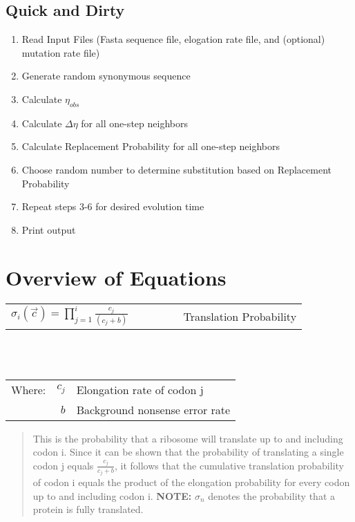 \documentclass{article}
\begin{document}
	\subsection{Quick and Dirty}
		\begin{enumerate}
			\item Read Input Files (Fasta sequence file, elogation rate file, and (optional) mutation rate file)
			\item Generate random synonymous sequence
			\item Calculate $\eta_{obs}$
			\item Calculate $\Delta\eta$ for all one-step neighbors
			\item Calculate Replacement Probability for all one-step neighbors
			\item Choose random number to determine substitution based on Replacement Probability
			\item Repeat steps 3-6 for desired evolution time
			\item Print output
		\end {enumerate}

	
		
\section{Overview of Equations}
	\begin{center}	
	
	\begin{tabular}[c]{r |l|}
		\cline{2-2}
		{\Large $\sigma_{i}(\vec{c})  =  \prod_{j=1}^i \frac{c_{j}}{(c_{j} + b)} \qquad \qquad$} & Translation Probability \\ \cline{2-2}
	\end{tabular} \\\
	
	\begin{tabular}{c r @{=} l}
		Where: & $c_{j}$ & Elongation rate of codon j \\
		& $b$ & Background nonsense error rate \\
	\end{tabular}
		
	\end{center}
	
	\begin{quote}
		This is the probability that a ribosome will translate up to and including codon i. Since it can be shown that the probability of 
		translating a single codon j equals $\frac{c_{j}}{c_{j}+b}$, it follows that the cumulative translation probability of codon i equals 
		the product of the elongation probability for every codon up to and including codon i. \textbf{NOTE:} $\sigma_{n}$ denotes the 
		probability that a protein is fully translated. \\ 
	\end{quote} 
	
\end{document}
